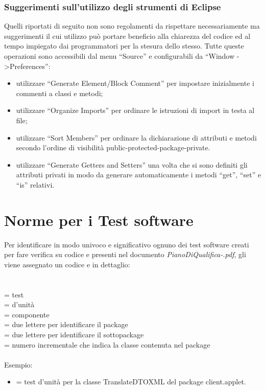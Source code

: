 \subsection{Suggerimenti sull'utilizzo degli strumenti di Eclipse}
Quelli riportati di seguito non sono regolamenti da rispettare necessariamente
ma suggerimenti il cui utilizzo pu\`o portare beneficio alla chiarezza del
codice ed al tempo impiegato dai programmatori per la stesura dello stesso.
Tutte queste operazioni sono accessibili dal menu ``Source'' e configurabili da
``Window -\textgreater Preferences'':
\begin{itemize}
  \item utilizzare ``Generate Element/Block Comment'' per impostare inizialmente
  i commenti a classi e metodi;
  \item utilizzare ``Organize Imports'' per ordinare le istruzioni di import in
  testa al file;
  \item utilizzare ``Sort Members'' per ordinare la dichiarazione di attributi e
  metodi secondo l'ordine di visibilit\`a public-protected-package-private.
  \item utilizzare ``Generate Getters and Setters'' una volta che si sono
  definiti gli attributi privati in modo da generare automaticamente i metodi
  ``get'', ``set'' e ``is'' relativi.
\end{itemize}

\newpage
\chapter{Norme per i Test software}
Per identificare in modo univoco e significativo ognuno dei test software creati
per fare verifica su codice e presenti nel documento \emph{PianoDiQualifica-\versionePQ.pdf}, gli viene assegnato un codice e in
dettaglio:\\ \\
 \\
 = test \\
 = d'unit\`a \\
 = componente \\
 = due lettere per identificare il package \\
 = due lettere per identificare il sottopackage \\
 = numero incrementale che indica la classe contenuta nel package
\\ \\
Esempio:
\begin{itemize}
  \item {} = test d'unit\`a per la classe TranslateDTOXML del
  package client.applet.
\end{itemize}

